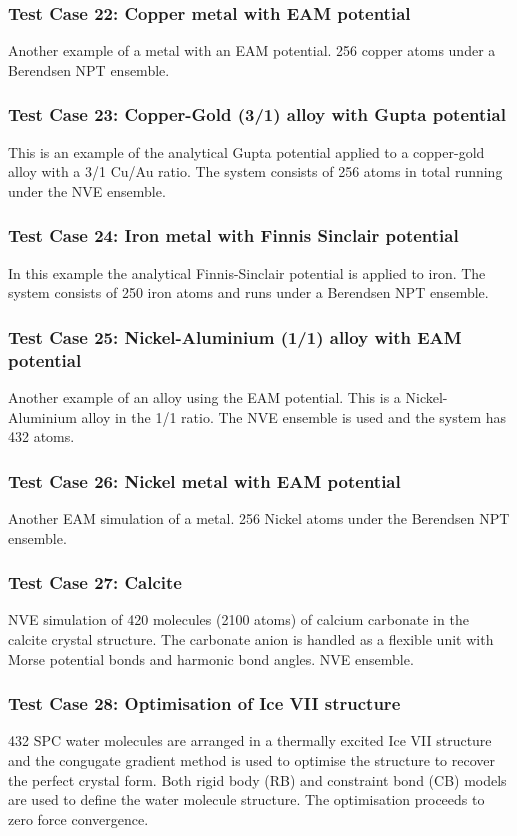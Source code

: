 \subsubsection{Test Case 22: Copper metal with EAM potential}
Another example of a metal with an EAM potential. 256 copper atoms
under a Berendsen NPT ensemble.

\subsubsection{Test Case 23: Copper-Gold (3/1) alloy with Gupta
potential} 
This is an example of the analytical Gupta potential
applied to a copper-gold alloy with a 3/1 Cu/Au ratio. The system
consists of 256 atoms in total running under the NVE ensemble.

\subsubsection{Test Case 24: Iron metal with Finnis Sinclair
potential}
In this example the analytical Finnis-Sinclair potential is applied to
iron. The system consists of 250 iron atoms and runs under a Berendsen
NPT ensemble.

\subsubsection{Test Case 25: Nickel-Aluminium (1/1) alloy with EAM
potential}
Another example of an alloy using the EAM potential. This is a
Nickel-Aluminium alloy in the 1/1 ratio. The NVE ensemble is used and
the system has 432 atoms.

\subsubsection{Test Case 26: Nickel metal with EAM potential}
Another EAM simulation of a metal. 256 Nickel atoms under the
Berendsen NPT ensemble.

\subsubsection{Test Case 27: Calcite}
NVE simulation of 420 molecules (2100 atoms) of calcium carbonate in
the calcite crystal structure. The carbonate anion is handled as a
flexible unit with Morse potential bonds and harmonic bond angles. NVE
ensemble.

\subsubsection{Test Case 28: Optimisation of Ice VII structure}
432 SPC water molecules are arranged in a thermally excited Ice VII
structure and the congugate gradient method is used to optimise the
structure to recover the perfect crystal form. Both rigid body (RB)
and constraint bond (CB) models are used to define the water molecule
structure. The optimisation proceeds to zero force convergence.

